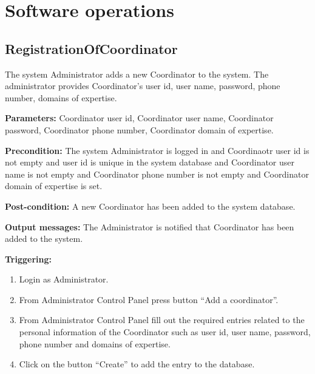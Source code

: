 \chapter{Software operations}
\label{chap:soptware_operations}

\section{RegistrationOfCoordinator}
\label{operation:RegistrationOfCoordinator}
The system Administrator adds a new Coordinator to the system. The administrator 
provides Coordinator's user id, user name, password, phone number, domains of
expertise.

\begin{description}

\item \textbf{Parameters:} Coordinator user id, Coordinator user name,
Coordinator password, Coordinator phone number, Coordinator domain of expertise.
\item \textbf{Precondition:} The system Administrator is logged in and
Coordinaotr user id is not empty and user id is unique in the system database
and Coordinator user name is not empty and Coordinator phone number is not empty and Coordinator domain of expertise is
set.
\item \textbf{Post-condition:} A new Coordinator has been added to the system
database.
\item \textbf{Output messages:} The Administrator is notified that Coordinator
has been added to the system.

\item \textbf{Triggering:}
\begin{enumerate}
\item Login as Administrator.
\item From Administrator Control Panel press button ``Add a coordinator''.
\item From Administrator Control Panel fill out the required entries related to
the personal information of the Coordinator such as user id, user name,
password, phone number and domains of expertise.
\item Click on the button ``Create'' to add the entry to the database.
\end{enumerate}
 
\end{description}



